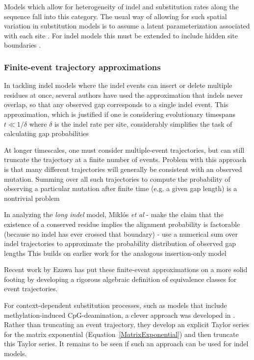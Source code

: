 \documentclass{bmcart}
\newcommand{\eqref}[1]{Equation~\ref{#1}}
\begin{document}
Models which allow for heterogeneity of indel and substitution rates along the sequence
fall into this category. The usual way of allowing for such spatial variation
in substitution models is to assume a latent parameterization associated with each site \cite{Yang93,Yang94}.
For indel models this must be extended to include hidden site boundaries \cite{RivasEddy2015}.

\subsubsection*{Finite-event trajectory approximations}

In tackling indel models where the indel events can insert or delete multiple residues at once,
several authors have used the approximation that indels never overlap,
so that any observed gap corresponds to a single indel event.
This approximation, which is justified if one is considering evolutionary timespans $t \ll 1/\delta$
where $\delta$ is the indel rate per site,
considerably simplifies the task of calculating gap probabilities
\cite{KnudsenMiyamoto2003,RedelingsSuchard2005,SuchardRedelings2006,RedelingsSuchard2007,WestessonEtAlArxiv2011,WestessonEtAl2012,WestessonBarquistHolmes2012}

At longer timescales, one must consider multiple-event trajectories, but can still truncate the trajectory
at a finite number of events.
Problem with this approach is that many different trajectories will generally be consistent with an observed mutation.
Summing over all such trajectories to compute the probability of observing a particular mutation after finite time
(e.g. a given gap length)
is a nontrivial problem

In analyzing the {\em long indel} model, Mikl\'{o}s {\em et al} \cite{MiklosLunterHolmes2004}
 - make the claim that the existence of a conserved residue implies the alignment probability is factorable (because no indel has ever crossed that boundary)
 - use a numerical sum over indel trajectories to approximate the probability distribution of observed gap lengths
This builds on earlier work for the analogous insertion-only model \cite{MiklosEtal2001}

Recent work by Ezawa has put these finite-event approximations on a more solid footing
by developing a rigorous algebraic definition of equivalence classes for event trajectories.

For context-dependent substitution processes,
such as models that include methylation-induced CpG-deamination,
a clever approach was developed in \cite{LunterHein04}.
Rather than truncating an event trajectory, they develop an explicit Taylor series for the matrix exponential
(\eqref{MatrixExponential}) and then truncate this Taylor series.
It remains to be seen if such an approach can be used for indel models.
\end{document}
